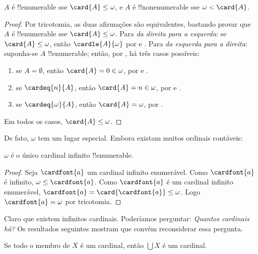 \documentclass[../../../include/open-logic-section]{subfiles}
\begin{document}
\begin{prop}
$A$ é !!{enumerable} sse $\card{A} \leq \omega$, e $A$ é
!!{nonenumerable} sse $\omega < \card{A}$.
\end{prop}

\begin{proof}
Por tricotomia, as duas afirmações são equivalentes, bastando provar
que $A$ é !!{enumerable} sse $\card{A} \leq \omega$. Para
\emph{da direita para a esquerda}: se $\card{A} \leq \omega$, então
$\cardle{A}{\omega}$ por
 e
. Para \emph{da esquerda para a direita}: suponha-se $A$
!!{enumerable}; então, por , há
três casos possíveis:
\begin{enumerate}
	\item se $A = \emptyset$, então $\card{A} = 0 \in \omega$, por
	 e
	.
	\item se $\cardeq{n}{A}$, então $\card{A} = n \in \omega$, por
	 e
	.
	\item se $\cardeq{\omega}{A}$, então $\card{A} = \omega$, por .
\end{enumerate}
Em todos os casos, $\card{A} \leq \omega$.
\end{proof}
\noindent
De fato, $\omega$ tem um lugar especial. Embora existam muitos ordinais contáveis:

\begin{cor}
$\omega$ é o único cardinal infinito !!{enumerable}.
\end{cor}

\begin{proof}
Seja $\cardfont{a}$ um cardinal infinito enumerável. Como
$\cardfont{a}$ é infinito, $\omega \leq \cardfont{a}$. Como
$\cardfont{a}$ é um cardinal infinito enumerável, $\cardfont{a} =
\card{\cardfont{a}} \leq \omega$. Logo $\cardfont{a} = \omega$ por
tricotomia. \end{proof}

Claro que existem infinitos cardinais. Poderíamos perguntar:
\emph{Quantos cardinais há?} Os resultados seguintes mostram que
convém reconsiderar essa pergunta.

\begin{prop}
Se todo o membro de $X$ é um cardinal, então $\bigcup X$ é um cardinal.
\end{prop}
\end{document}
